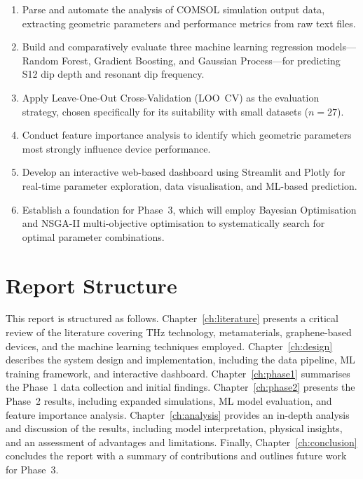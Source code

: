 \documentclass[12pt,a4paper]{report}
\begin{document}
\begin{enumerate}[leftmargin=2cm]
    \item Parse and automate the analysis of COMSOL simulation output data, extracting geometric parameters and performance metrics from raw text files.
    \item Build and comparatively evaluate three machine learning regression models---Random Forest, Gradient Boosting, and Gaussian Process---for predicting S12 dip depth and resonant dip frequency.
    \item Apply Leave-One-Out Cross-Validation (LOO~CV) as the evaluation strategy, chosen specifically for its suitability with small datasets ($n = 27$).
    \item Conduct feature importance analysis to identify which geometric parameters most strongly influence device performance.
    \item Develop an interactive web-based dashboard using Streamlit and Plotly for real-time parameter exploration, data visualisation, and ML-based prediction.
    \item Establish a foundation for Phase~3, which will employ Bayesian Optimisation and NSGA-II multi-objective optimisation to systematically search for optimal parameter combinations.
\end{enumerate}

\section{Report Structure}
\label{sec:report_structure}

This report is structured as follows. Chapter~\ref{ch:literature} presents a critical review of the literature covering THz technology, metamaterials, graphene-based devices, and the machine learning techniques employed. Chapter~\ref{ch:design} describes the system design and implementation, including the data pipeline, ML training framework, and interactive dashboard. Chapter~\ref{ch:phase1} summarises the Phase~1 data collection and initial findings. Chapter~\ref{ch:phase2} presents the Phase~2 results, including expanded simulations, ML model evaluation, and feature importance analysis. Chapter~\ref{ch:analysis} provides an in-depth analysis and discussion of the results, including model interpretation, physical insights, and an assessment of advantages and limitations. Finally, Chapter~\ref{ch:conclusion} concludes the report with a summary of contributions and outlines future work for Phase~3.
\end{document}
